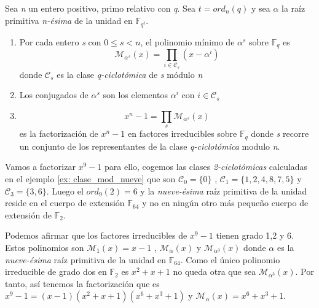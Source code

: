 \begin{theorem}
\label{factorizar_xn}
Sea \textit{n} un entero positivo, primo relativo con \textit{q}. Sea $t = ord_n(q)$ y sea $\alpha$ la raíz primitiva \textit{n-ésima} de la unidad en $\mathbb{F}_{q^t}$.
\begin{enumerate}

	\item Por cada entero \textit{s} con $0 \leq s < n$, el polinomio mínimo de $\alpha^s$ sobre  $\mathbb{F}_q$ es
	\[
	\mathcal{M}_{\alpha^s}(x) = \prod_{i \in \mathcal{C}_s} (x-\alpha^i)
	\] 
	donde $\mathcal{C}_s$ es la clase \textit{q-ciclotómica} de \textit{s} módulo \textit{n}
	\item  Los conjugados de $\alpha^s$ son los elementos $\alpha^i$ con $i \in \mathcal{C}_s$
	\item  
	\[
	x^n-1 =  \prod_{s} \mathcal{M}_{\alpha^s}(x) 
	\]
	es la factorización de $x^n-1$ en factores irreducibles sobre $\mathbb{F}_q$ donde \textit{s} recorre un conjunto de los representantes de la clase \textit{q-ciclotómica} modulo \textit{n}.
\end{enumerate}
\end{theorem}
 

 \begin{exampleth}
Vamos a factorizar $x^9-1$ para ello, cogemos las clases \textit{2-ciclotómicas} calculadas en el ejemplo \ref{ex: clase_mod_nueve} que son $\mathcal{C}_0 = \{ 0 \}$ , $\mathcal{C}_1 = \{ 1,2,4,8,7,5 \}$ y $\mathcal{C}_3 = \{ 3,6 \}$. Luego el $ord_9(2) = 6$ y la \textit{nueve-ésima} raíz primitiva de la unidad reside en el cuerpo de extensión $\mathbb{F}_{64}$ y no en ningún otro más pequeño cuerpo de extensión de $\mathbb{F}_2$.

Podemos afirmar que los factores irreducibles de $x^9-1$ tienen grado 1,2 y 6. Estos polinomios son $\mathcal{M}_{1}(x) = x -1 $ , $\mathcal{M}_{\alpha}(x)$ y $\mathcal{M}_{\alpha^3}(x)$ donde $\alpha$ es la \textit{nueve-ésima} raíz primitiva de la unidad en $\mathbb{F}_{64}$. Como el único polinomio irreducible de grado dos en $\mathbb{F}_2$ es $x^2+x+1$ no queda otra que sea $\mathcal{M}_{\alpha^3}(x)$. Por tanto, así tenemos la factorización que es $x^9-1 = (x-1)(x^2+x+1)(x^6+x^3+1)$ y $\mathcal{M}_{\alpha}(x) = x^6+x^3+1$.
 
 \end{exampleth}
 
